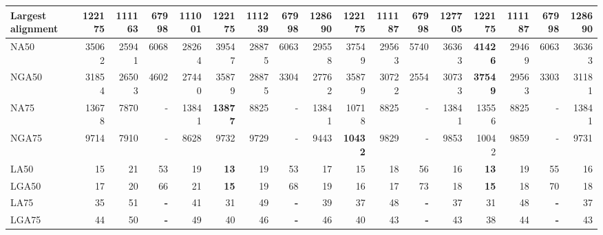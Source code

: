 \documentclass[12pt,a4paper]{article}
\begin{document}
\begin{table}[ht]
\begin{center}
\begin{tabular}{|l*{16}{|r}|}
Largest alignment & 122175 & 111163 & 67998 & 111001 & 122175 & 111239 & 67998 & {\bf 128690} & 122175 & 111187 & 67998 & 127705 & 122175 & 111187 & 67998 & {\bf 128690} \\ \hline
NA50 & 35062 & 25941 & 6068 & 28264 & 39547 & 28875 & 6063 & 29558 & 37549 & 29563 & 5740 & 36363 & {\bf 41426} & 29469 & 6063 & 36363 \\ \hline
NGA50 & 31854 & 26503 & 4602 & 27440 & 35879 & 28875 & 3304 & 27762 & 35879 & 30722 & 2554 & 30733 & {\bf 37549} & 29563 & 3303 & 31181 \\ \hline
NA75 & 13678 & 7870 & - & 13841 & {\bf 13877} & 8825 & - & 13841 & 10718 & 8825 & - & 13841 & 13556 & 8825 & - & 13841 \\ \hline
NGA75 & 9714 & 7910 & - & 8628 & 9732 & 9729 & - & 9443 & {\bf 10432} & 9829 & - & 9853 & 10042 & 9859 & - & 9731 \\ \hline
LA50 & 15 & 21 & 53 & 19 & {\bf 13} & 19 & 53 & 17 & 15 & 18 & 56 & 16 & {\bf 13} & 19 & 55 & 16 \\ \hline
LGA50 & 17 & 20 & 66 & 21 & {\bf 15} & 19 & 68 & 19 & 16 & 17 & 73 & 18 & {\bf 15} & 18 & 70 & 18 \\ \hline
LA75 & 35 & 51 & {\bf -} & 41 & 31 & 49 & {\bf -} & 39 & 37 & 48 & {\bf -} & 37 & 31 & 48 & {\bf -} & 37 \\ \hline
LGA75 & 44 & 50 & {\bf -} & 49 & 40 & 46 & {\bf -} & 46 & 40 & 43 & {\bf -} & 43 & 38 & 44 & {\bf -} & 43 \\ \hline
\end{tabular}
\end{center}
\end{table}
\end{document}
